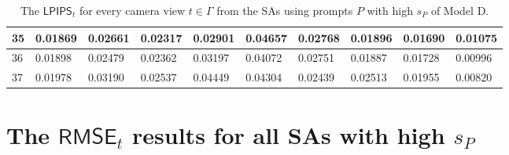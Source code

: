 \begin{table}[H]
{\begin{tabular}{|l|l|l|l|l|l|l|l|l|l|}
        35 & 0.01869 & 0.02661 & 0.02317 & 0.02901 & 0.04657 & 0.02768 & 0.01896 & 0.01690 & 0.01075 \\ \hline
        36 & 0.01898 & 0.02479 & 0.02362 & 0.03197 & 0.04072 & 0.02751 & 0.01887 & 0.01728 & 0.00996 \\ \hline
        37 & 0.01978 & 0.03190 & 0.02537 & 0.04449 & 0.04304 & 0.02439 & 0.02513 & 0.01955 & 0.00820 \\ \hline
    \end{tabular}}
	\caption{The $ \mathsf{LPIPS}_t$ for every camera view $t \in \varGamma$ from the SAs using prompts $P$ with high $s_P$ of Model D.}

\end{table}

\section{The  $ \mathsf{RMSE}_t$ results for all SAs with high $s_P$}

